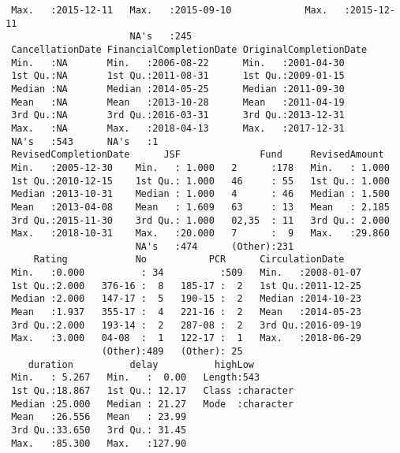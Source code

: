 \documentclass[11pt]{article}
\begin{document}
\begin{verbatim}
 Max.   :2015-12-11   Max.   :2015-09-10             Max.   :2015-12-11  
                      NA's   :245                                        
 CancellationDate FinancialCompletionDate OriginalCompletionDate
 Min.   :NA       Min.   :2006-08-22      Min.   :2001-04-30    
 1st Qu.:NA       1st Qu.:2011-08-31      1st Qu.:2009-01-15    
 Median :NA       Median :2014-05-25      Median :2011-09-30    
 Mean   :NA       Mean   :2013-10-28      Mean   :2011-04-19    
 3rd Qu.:NA       3rd Qu.:2016-03-31      3rd Qu.:2013-12-31    
 Max.   :NA       Max.   :2018-04-13      Max.   :2017-12-31    
 NA's   :543      NA's   :1                                     
 RevisedCompletionDate      JSF              Fund     RevisedAmount   
 Min.   :2005-12-30    Min.   : 1.000   2      :178   Min.   : 1.000  
 1st Qu.:2010-12-15    1st Qu.: 1.000   46     : 55   1st Qu.: 1.000  
 Median :2013-10-31    Median : 1.000   4      : 46   Median : 1.500  
 Mean   :2013-04-08    Mean   : 1.609   63     : 13   Mean   : 2.185  
 3rd Qu.:2015-11-30    3rd Qu.: 1.000   02,35  : 11   3rd Qu.: 2.000  
 Max.   :2018-10-31    Max.   :20.000   7      :  9   Max.   :29.860  
                       NA's   :474      (Other):231                   
     Rating            No           PCR      CirculationDate     
 Min.   :0.000          : 34          :509   Min.   :2008-01-07  
 1st Qu.:2.000   376-16 :  8   185-17 :  2   1st Qu.:2011-12-25  
 Median :2.000   147-17 :  5   190-15 :  2   Median :2014-10-23  
 Mean   :1.937   355-17 :  4   221-16 :  2   Mean   :2014-05-23  
 3rd Qu.:2.000   193-14 :  2   287-08 :  2   3rd Qu.:2016-09-19  
 Max.   :3.000   04-08  :  1   122-17 :  1   Max.   :2018-06-29  
                 (Other):489   (Other): 25                       
    duration          delay          highLow         
 Min.   : 5.267   Min.   :  0.00   Length:543        
 1st Qu.:18.867   1st Qu.: 12.17   Class :character  
 Median :25.000   Median : 21.27   Mode  :character  
 Mean   :26.556   Mean   : 23.99                     
 3rd Qu.:33.650   3rd Qu.: 31.45                     
 Max.   :85.300   Max.   :127.90                     
                                                     
    \end{verbatim}
\end{document}
